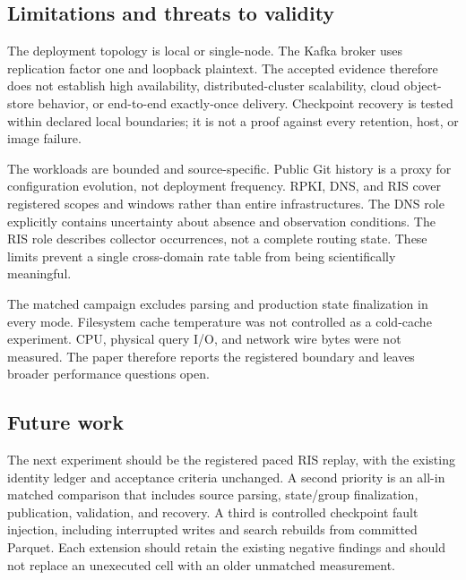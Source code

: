 \documentclass[a4paper,11pt]{article}
\begin{document}
\subsection{Limitations and threats to validity}
The deployment topology is local or single-node. The Kafka broker uses replication factor one and loopback plaintext. The accepted evidence therefore does not establish high availability, distributed-cluster scalability, cloud object-store behavior, or end-to-end exactly-once delivery. Checkpoint recovery is tested within declared local boundaries; it is not a proof against every retention, host, or image failure.

The workloads are bounded and source-specific. Public Git history is a proxy for configuration evolution, not deployment frequency. RPKI, DNS, and RIS cover registered scopes and windows rather than entire infrastructures. The DNS role explicitly contains uncertainty about absence and observation conditions. The RIS role describes collector occurrences, not a complete routing state. These limits prevent a single cross-domain rate table from being scientifically meaningful.

The matched campaign excludes parsing and production state finalization in every mode. Filesystem cache temperature was not controlled as a cold-cache experiment. CPU, physical query I/O, and network wire bytes were not measured. The paper therefore reports the registered boundary and leaves broader performance questions open.

\subsection{Future work}
The next experiment should be the registered paced RIS replay, with the existing identity ledger and acceptance criteria unchanged. A second priority is an all-in matched comparison that includes source parsing, state/group finalization, publication, validation, and recovery. A third is controlled checkpoint fault injection, including interrupted writes and search rebuilds from committed Parquet. Each extension should retain the existing negative findings and should not replace an unexecuted cell with an older unmatched measurement.

\end{document}
